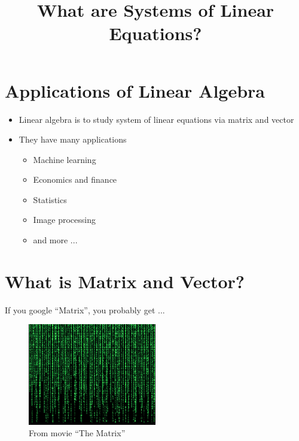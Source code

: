 \documentclass{beamer}
\title %
{What are Systems of Linear Equations?}
\author{}
\institute{WPI} %
\theoremstyle{definition}
\theoremstyle{theorem}
\begin{document}
\begin{frame}
  \titlepage
\end{frame}


\section{Applications of Linear Algebra}

\begin{frame}

\begin{itemize}
 \item Linear algebra is to study system of linear equations via matrix and vector
 \item They have many applications

\begin{itemize}
 \item  Machine learning
 \item Economics and finance 
 \item Statistics
 \item Image processing
 \item and more ...
\end{itemize}

\end{itemize}

\end{frame}



\section{What is Matrix and Vector?}

\begin{frame}
 {If you google ``Matrix'', you probably get ...}
 \pause
 \begin{figure}
  \includegraphics[width= 0.5\textwidth]{matrix.jpg}
  \caption{From movie ``The Matrix''}
  \label{fig:matrix}
\end{figure}
\end{frame}
\end{document}
